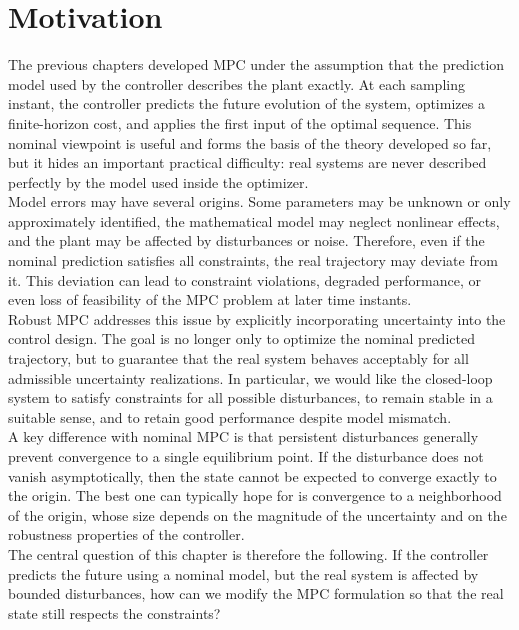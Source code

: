 \section{Motivation}

The previous chapters developed MPC under the assumption that the prediction model used by the
controller describes the plant exactly. At each sampling instant, the controller predicts the
future evolution of the system, optimizes a finite-horizon cost, and applies the first input of the
optimal sequence. This nominal viewpoint is useful and forms the basis of the theory developed
so far, but it hides an important practical difficulty: real systems are never described perfectly
by the model used inside the optimizer.\\

Model errors may have several origins. Some parameters may be unknown or only approximately
identified, the mathematical model may neglect nonlinear effects, and the plant may be affected
by disturbances or noise. Therefore, even if the nominal prediction satisfies all constraints, the
real trajectory may deviate from it. This deviation can lead to constraint violations, degraded
performance, or even loss of feasibility of the MPC problem at later time instants.\\
Robust MPC addresses this issue by explicitly incorporating uncertainty into the control
design. The goal is no longer only to optimize the nominal predicted trajectory, but to guarantee
that the real system behaves acceptably for all admissible uncertainty realizations. In particular,
we would like the closed-loop system to satisfy constraints for all possible disturbances, to remain
stable in a suitable sense, and to retain good performance despite model mismatch.\\
A key difference with nominal MPC is that persistent disturbances generally prevent convergence
to a single equilibrium point. If the disturbance does not vanish asymptotically, then the state
cannot be expected to converge exactly to the origin. The best one can typically hope for is
convergence to a neighborhood of the origin, whose size depends on the magnitude of the
uncertainty and on the robustness properties of the controller.\\

The central question of this chapter is therefore the following. If the controller predicts the
future using a nominal model, but the real system is affected by bounded disturbances, how can
we modify the MPC formulation so that the real state still respects the constraints?

